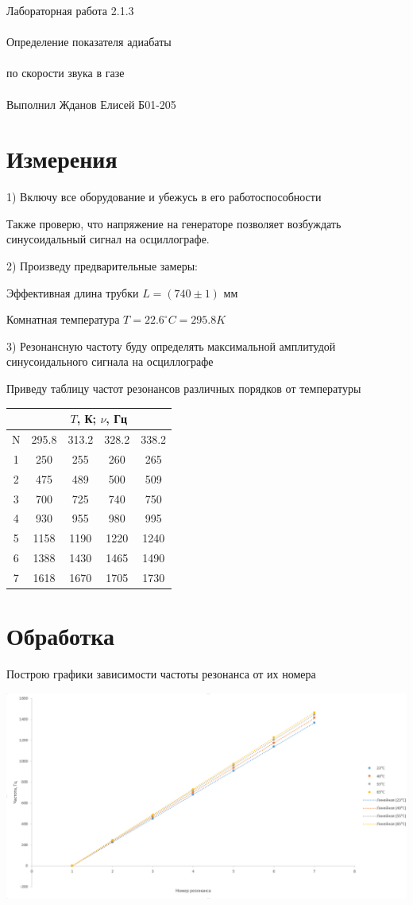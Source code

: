\documentclass{astroedu-lab}
\begin{document}
\begin{problem}{\huge Лабораторная работа 2.1.3\\\\Определение показателя адиабаты\\\\по скорости звука в газе\\\\Выполнил Жданов Елисей Б01-205}
\section{Измерения}

1) Включу все оборудование и убежусь в его работоспособности

Также проверю, что напряжение на генераторе позволяет возбуждать синусоидальный сигнал на осциллографе.

2) Произведу предварительные замеры:

Эффективная длина трубки $L = (740 \pm 1)$ мм

Комнатная температура $T = 22.6 ^\circ C = 295.8 K$

3) Резонансную частоту буду определять максимальной амплитудой синусоидального сигнала на осциллографе

Приведу таблицу частот резонансов различных порядков от температуры

\begin{center}
\begin{tabular}{|c|c|c|c|c|}
\hline & \multicolumn{4}{|c|}{$T$, К;   $\nu$, Гц} \\ \hline
N &	295.8	& 313.2	& 328.2	& 338.2	\\ \hline
1 & 250		& 255	& 260	& 265	\\
2 & 475		& 489	& 500	& 509	\\
3 & 700		& 725	& 740	& 750	\\
4 & 930		& 955	& 980	& 995	\\
5 & 1158	& 1190	& 1220	& 1240	\\
6 & 1388	& 1430	& 1465	& 1490	\\
7 & 1618	& 1670	& 1705	& 1730	\\
\hline
\end{tabular}
\end{center}

\section{Обработка}

Построю графики зависимости частоты резонанса от их номера

\begin{center}
\includegraphics[width=1\textwidth]{график.png}
\label{ris:image}
\end{center}


\end{problem}
\end{document}

